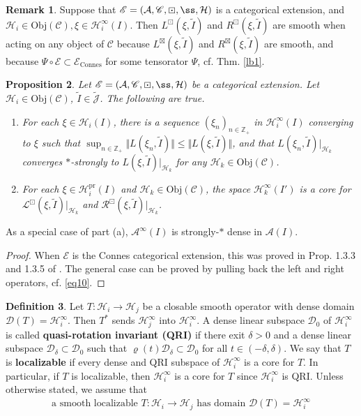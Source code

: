 \documentclass[11pt,b5paper,notitlepage]{article}
\theoremstyle{definition}
\newtheorem{df}{Definition}[section]
\newtheorem{rem}[df]{Remark}
\theoremstyle{plain}
\newtheorem{pp}[df]{Proposition}
\newcommand{\mc}{\mathcal}
\newcommand{\wtd}{\widetilde}
\newcommand{\Dom}{\scr D}
\newcommand{\scr}{\mathscr}
\newcommand{\Jtd}{\widetilde{\mathcal J}}
\newcommand{\Zbb}{\mathbb Z}
\newcommand{\pr}{\mathrm {pr}}
\newcommand{\Obj}{\mathrm{Obj}}
\newcommand{\Connes}{\mathrm{Connes}}
\numberwithin{equation}{section}
\begin{document}
\begin{rem}
Suppose that $\scr E=(\mc A,\scr C,\boxdot,\ss,\mc H)$ is a categorical extension, and $\mc H_i\in\Obj(\scr C),\xi\in\mc H_i^\infty(I)$. Then $L^\boxdot(\xi,\wtd I)$ and $R^\boxdot(\xi,\wtd I)$ are smooth when acting on any object of $\scr C$ because $L^\boxtimes(\xi,\wtd I)$ and $R^\boxtimes(\xi,\wtd I)$ are smooth, and because $\Psi\circ\scr E\subset\scr E_\Connes$ for some tensorator $\Psi$, cf. Thm. \ref{lb1}.
\end{rem}





\begin{pp}\label{lb4}
Let $\scr E=(\mc A,\scr C,\boxdot,\ss,\mc H)$ be a categorical extension. Let $\mc H_i\in\Obj(\scr C)$, $\wtd I\in\Jtd$. The following are true.
\begin{enumerate}[label=(\alph*)]
\item For each $\xi\in\mc H_i(I)$, there is a sequence $(\xi_n)_{n\in\Zbb_+}$ in $\mc H_i^\infty(I)$ converging to $\xi$ such that $\sup_{n\in\Zbb_+}\Vert L(\xi_n,\wtd I)\Vert\leq\Vert L(\xi,\wtd I)\Vert$, and that $L(\xi_n,\wtd I)|_{\mc H_k}$ converges $*$-strongly to $L(\xi,\wtd I)|_{\mc H_k}$ for any $\mc H_k\in\Obj(\scr C)$.
\item For each $\xi\in\mc H_i^\pr(I)$ and $\mc H_k\in\Obj(\scr C)$, the space $\mc H_k^\infty(I')$ is a core for $\scr L^\boxdot(\xi,\wtd I)|_{\mc H_k}$ and $\scr R^\boxdot(\xi,\wtd I)|_{\mc H_k}$. 
\end{enumerate}
\end{pp}

As a special case of part (a), $\mc A^\infty(I)$ is strongly-$*$ dense in $\mc A(I)$.

\begin{proof}
When $\scr E$ is the Connes categorical extension, this was proved in Prop. 1.3.3 and 1.3.5 of \cite{Gui20}. The general case can be proved by pulling back the left and right operators, cf. \eqref{eq10}.
\end{proof}



\begin{df}\label{lb32}
Let $T:\mc H_i\rightarrow\mc H_j$ be a closable smooth operator with dense domain $\Dom(T)=\mc H_i^\infty$. Then $T^*$ sends $\mc H_j^\infty$ into $\mc H_i^\infty$. A dense linear subspace $\Dom_0$ of $\mc H_i^\infty$ is called \textbf{quasi-rotation invariant (QRI)} if there exit $\delta>0$ and a dense linear subspace $\Dom_\delta\subset\Dom_0$ such that $\varrho(t)\Dom_\delta\subset\Dom_0$ for all $t\in(-\delta,\delta)$. We say that $T$ is \textbf{localizable} if every dense and QRI subspace of $\mc H_i^\infty$ is a core for $T$. In particular, if $T$ is localizable, then $\mc H_i^\infty$ is a core for $T$ since $\mc H_i^\infty$ is QRI. Unless otherwise stated, we assume that
\begin{align*}
\text{a smooth localizable $T:\mc H_i\rightarrow\mc H_j$ has domain $\Dom(T)=\mc H_i^\infty$}
\end{align*}
\end{df}
\end{document}
